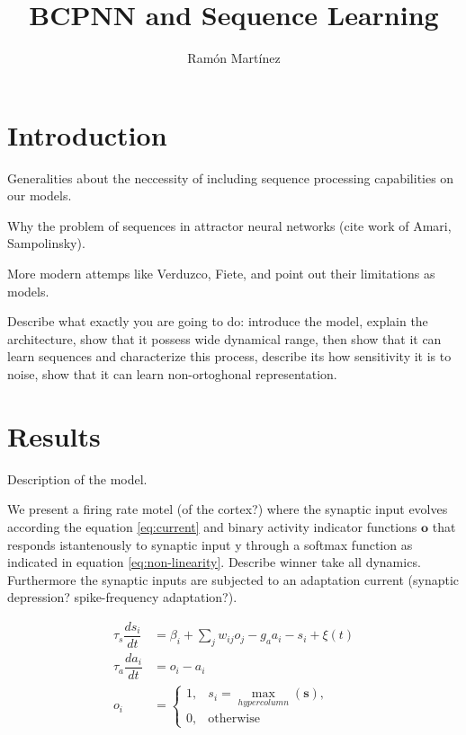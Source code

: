 \documentclass[10pt,a4paper]{article}
\author{Ram\'on Mart\'inez}
\title{BCPNN and Sequence Learning}
\begin{document}
\maketitle

\section{Introduction}

Generalities about the neccessity of including sequence processing capabilities on our models.

Why the problem of sequences in attractor neural networks (cite work of Amari, Sampolinsky).

More modern attemps like Verduzco, Fiete, and point out their limitations as models. 

Describe what exactly you are going to do: introduce the model, explain the architecture, show that it possess wide dynamical range, then show that it can learn sequences and characterize this process, describe its how sensitivity it is to noise, show that it can learn non-ortoghonal representation. 

\section{Results}

Description of the model. 

We present a firing rate motel (of the cortex?) where the synaptic input evolves according the equation \ref{eq:current} and binary activity indicator functions $\mathbf{o}$ that responds istantenously to synaptic input y through a softmax function as indicated in equation \ref{eq:non-linearity}. Describe winner take all dynamics. Furthermore the synaptic inputs are subjected to an adaptation current (synaptic depression? spike-frequency adaptation?). 

\begin{align}
\tau_s \dfrac{ds_i}{dt} &= \beta_i + \sum_{j} w_{ij} o_j  - g_a a_i - s_i  + \xi(t) \label{eq:current} \\ 
\tau_a \dfrac{da_i}{dt} &= o_i - a_i \label{eq:adaptation} \\
o_i &=   \begin{cases}
       1,&  s_i = \underset{hypercolumn}{\max}(\mathbf{s}),\\
       0 ,& \text{otherwise}
    \end{cases} \label{eq:non-linearity}
\end{align}
\end{document}
